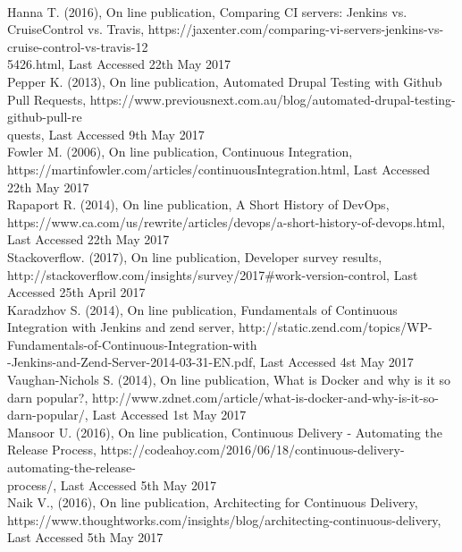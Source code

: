 \begin{thebibliography}{0}
\\
Hanna T. (2016), On line publication, Comparing CI servers: Jenkins vs. CruiseControl vs. Travis, https://jaxenter.com/comparing-vi-servers-jenkins-vs-cruise-control-vs-travis-12\\5426.html, Last Accessed 22th May 2017
\\
Pepper K. (2013), On line publication, Automated Drupal Testing with Github Pull Requests, https://www.previousnext.com.au/blog/automated-drupal-testing-github-pull-re\\quests, Last Accessed 9th May 2017
\\
Fowler M. (2006),  On line publication, Continuous Integration, https://martinfowler.com/articles/continuousIntegration.html, Last Accessed 22th May 2017
\\
Rapaport R. (2014), On line publication, A Short History of DevOps, https://www.ca.com/us/rewrite/articles/devops/a-short-history-of-devops.html, Last Accessed 22th May 2017
\\
Stackoverflow. (2017), On line publication, Developer survey results, http://stackoverflow.com/insights/survey/2017\#work-version-control, Last Accessed 25th April 2017
\\
Karadzhov S. (2014), On line publication, Fundamentals of Continuous Integration with Jenkins and zend server, http://static.zend.com/topics/WP-Fundamentals-of-Continuous-Integration-with\\
-Jenkins-and-Zend-Server-2014-03-31-EN.pdf, Last Accessed 4st May 2017
\\
Vaughan-Nichols S. (2014), On line publication, What is Docker and why is it so darn popular?, http://www.zdnet.com/article/what-is-docker-and-why-is-it-so-darn-popular/, Last Accessed 1st May 2017
\\
Mansoor U. (2016), On line publication, Continuous Delivery - Automating the Release Process, https://codeahoy.com/2016/06/18/continuous-delivery-automating-the-release-\\process/, Last Accessed 5th May 2017
\\
Naik V., (2016), On line publication, Architecting for Continuous Delivery, https://www.thoughtworks.com/insights/blog/architecting-continuous-delivery, Last Accessed 5th May 2017

\end{thebibliography}